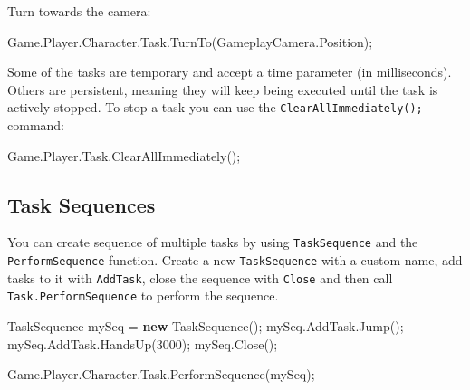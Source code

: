 \documentclass[
  openany]{book}
\newenvironment{Shaded}{\begin{snugshade}}{\end{snugshade}}
\newcommand{\DecValTok}[1]{\textcolor[rgb]{0.00,0.00,0.81}{#1}}
\newcommand{\FunctionTok}[1]{\textcolor[rgb]{0.00,0.00,0.00}{#1}}
\newcommand{\KeywordTok}[1]{\textcolor[rgb]{0.13,0.29,0.53}{\textbf{#1}}}
\newcommand{\NormalTok}[1]{#1}
\begin{document}
Turn towards the camera:

\begin{Shaded}
\begin{Highlighting}[]
\NormalTok{Game.}\FunctionTok{Player}\NormalTok{.}\FunctionTok{Character}\NormalTok{.}\FunctionTok{Task}\NormalTok{.}\FunctionTok{TurnTo}\NormalTok{(GameplayCamera.}\FunctionTok{Position}\NormalTok{);}
\end{Highlighting}
\end{Shaded}

Some of the tasks are temporary and accept a time parameter (in milliseconds). Others are persistent, meaning they will keep being executed until the task is actively stopped. To stop a task you can use the \texttt{ClearAllImmediately();} command:

\begin{Shaded}
\begin{Highlighting}[]
\NormalTok{Game.}\FunctionTok{Player}\NormalTok{.}\FunctionTok{Task}\NormalTok{.}\FunctionTok{ClearAllImmediately}\NormalTok{();}
\end{Highlighting}
\end{Shaded}

\hypertarget{task-sequences}{%
\subsection*{Task Sequences}\label{task-sequences}}

You can create sequence of multiple tasks by using \texttt{TaskSequence} and the \texttt{PerformSequence} function.
Create a new \texttt{TaskSequence} with a custom name, add tasks to it with \texttt{AddTask}, close the sequence with \texttt{Close} and then call \texttt{Task.PerformSequence} to perform the sequence.

\begin{Shaded}
\begin{Highlighting}[]
\NormalTok{TaskSequence mySeq = }\KeywordTok{new} \FunctionTok{TaskSequence}\NormalTok{();}
\NormalTok{mySeq.}\FunctionTok{AddTask}\NormalTok{.}\FunctionTok{Jump}\NormalTok{();}
\NormalTok{mySeq.}\FunctionTok{AddTask}\NormalTok{.}\FunctionTok{HandsUp}\NormalTok{(}\DecValTok{3000}\NormalTok{);}
\NormalTok{mySeq.}\FunctionTok{Close}\NormalTok{();}
                
\NormalTok{Game.}\FunctionTok{Player}\NormalTok{.}\FunctionTok{Character}\NormalTok{.}\FunctionTok{Task}\NormalTok{.}\FunctionTok{PerformSequence}\NormalTok{(mySeq);}
\end{Highlighting}
\end{Shaded}
\end{document}
